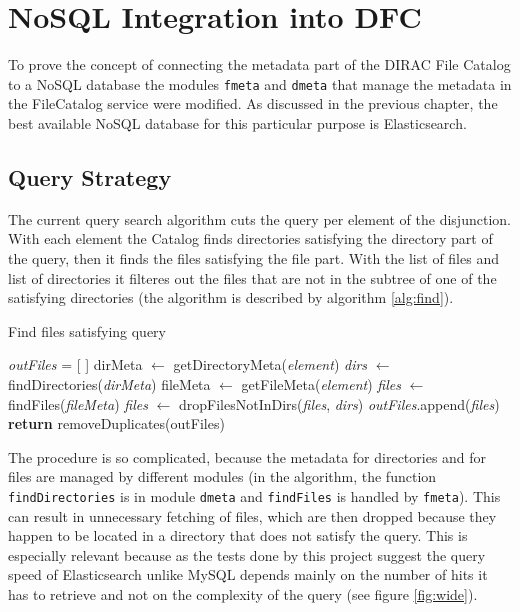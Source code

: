 \chapter{NoSQL Integration into DFC}
\label{chap:NoSQL}

To prove the concept of connecting the metadata part of the DIRAC File Catalog to a NoSQL database the 
modules \texttt{fmeta} and \texttt{dmeta} that manage the metadata in the FileCatalog service were modified.
As discussed in the previous chapter, the best available NoSQL database for this particular purpose is 
Elasticsearch. 

\section{Query Strategy}
The current query search algorithm cuts the query per element of the disjunction. With each element the Catalog
finds directories satisfying the directory part of the query, then it finds the files satisfying the file part. 
With the list of files and list of directories it filteres out the files that are not in the subtree of one of the
satisfying directories (the algorithm is described by algorithm \ref{alg:find}).

\begin{algorithm}[h]
\caption{Find files satisfying query}
\label{alg:find}
\begin{algorithmic}[1]
	\State \textit{outFiles} = [  ]
		\State dirMeta $\leftarrow$ getDirectoryMeta(\textit{element})
		\State \textit{dirs} $\leftarrow$ findDirectories(\textit{dirMeta}) 
		\State fileMeta $\leftarrow$ getFileMeta(\textit{element})
		\State \textit{files} $\leftarrow$ findFiles(\textit{fileMeta})
		\State \textit{files} $\leftarrow$ dropFilesNotInDirs(\textit{files}, \textit{dirs})
		\State \textit{outFiles}.append(\textit{files})
	\EndFor
	\State \textbf{return} removeDuplicates(outFiles)
\EndFunction
\end{algorithmic}
\end{algorithm}

The procedure is so complicated, because the metadata for directories and for files are managed by different 
modules (in the algorithm, the function \texttt{findDirectories} is in module \texttt{dmeta} and \texttt{findFiles} 
is handled by \texttt{fmeta}). This can result in unnecessary fetching of files, which are then dropped because
they happen to be located in a directory that does not satisfy the query. This is especially relevant because as
the tests done by this project suggest the query speed of Elasticsearch unlike MySQL depends mainly on the
number of hits it has to retrieve and
not on the complexity of the query (see figure \ref{fig:wide}). 

